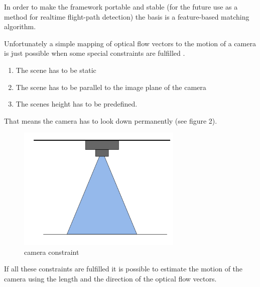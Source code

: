 \documentclass[11pt]{article}
\begin{document}
	In order to make the framework portable and stable (for the future use as a method for realtime flight-path detection) the basis is a feature-based matching algorithm.

	Unfortunately a simple mapping of optical flow vectors to the motion of a camera is just possible when some special constraints are fulfilled \cite{BewegungsanalyseMuenchen}.
	
	\begin{enumerate}
	  \item The scene has to be static
	  \item The scene has to be parallel to the image plane of the camera
	  \item The scenes height has to be predefined.
	\end{enumerate}
	
	That means the camera has to look down permanently (see figure 2).

	\begin{figure}[H]
		\centering
		\includegraphics[width=0.7\textwidth]{images/look_down.png}
		\caption{camera constraint}
	\end{figure}

	
	If all these constraints are fulfilled it is possible to estimate the motion of the camera using the length and the direction of the optical flow vectors.
\end{document}
